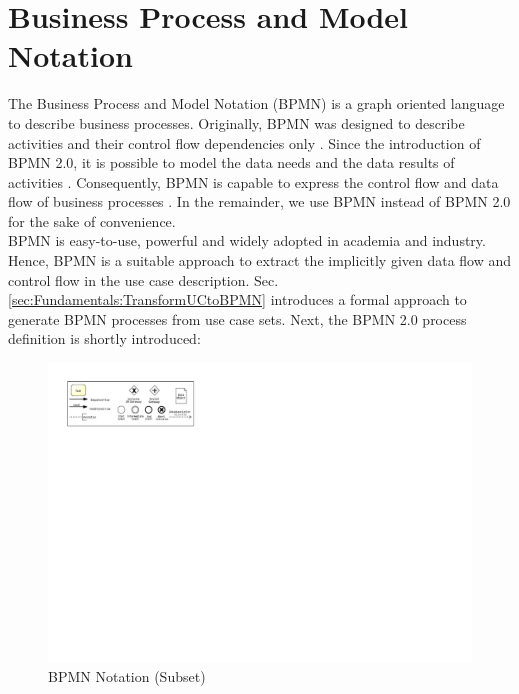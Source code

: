 \section{Business Process and Model Notation}
\label{sec:PrepApproach:BPMN}
The Business Process and Model Notation (BPMN) is a graph oriented language to describe business processes. Originally, BPMN was designed to describe activities and their control flow dependencies only \cite{VisualizeBPMN}. Since the introduction of BPMN 2.0, it is possible to model the data needs and the data results of activities \cite{OMG}. Consequently, BPMN is capable to express the control flow and data flow of business processes \cite{DataFlowErrorBPMN}. In the remainder, we use BPMN instead of BPMN 2.0 for the sake of convenience. \\
BPMN is easy-to-use, powerful and widely adopted in academia and industry. Hence, BPMN is a suitable approach to extract the implicitly given data flow and control flow in the use case description. Sec. \ref{sec:Fundamentals:TransformUCtoBPMN} introduces a formal approach to generate BPMN processes from use case sets. Next, the BPMN 2.0 process definition is shortly introduced:


\begin{figure}[h!]
	\includegraphics[width=\textwidth, trim={1cm 16.5cm 19.2cm 1cm}]{img/Overview.pdf}
	\caption{BPMN Notation (Subset)}
	\label{fig:BPMNSubset}
\end{figure}

